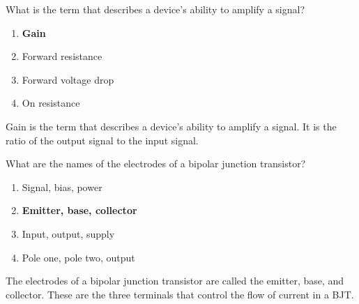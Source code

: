 \begin{tcolorbox}[colback=gray!10!white,colframe=black!75!black,title={T6B11}]
    What is the term that describes a device's ability to amplify a signal?
    \begin{enumerate}[label=\Alph*),noitemsep]
        \item \textbf{Gain}
        \item Forward resistance
        \item Forward voltage drop
        \item On resistance
    \end{enumerate}
\end{tcolorbox}
Gain is the term that describes a device's ability to amplify a signal. It is the ratio of the output signal to the input signal.

\begin{tcolorbox}[colback=gray!10!white,colframe=black!75!black,title={T6B12}]
    What are the names of the electrodes of a bipolar junction transistor?
    \begin{enumerate}[label=\Alph*),noitemsep]
        \item Signal, bias, power
        \item \textbf{Emitter, base, collector}
        \item Input, output, supply
        \item Pole one, pole two, output
    \end{enumerate}
\end{tcolorbox}
The electrodes of a bipolar junction transistor are called the emitter, base, and collector. These are the three terminals that control the flow of current in a BJT.
